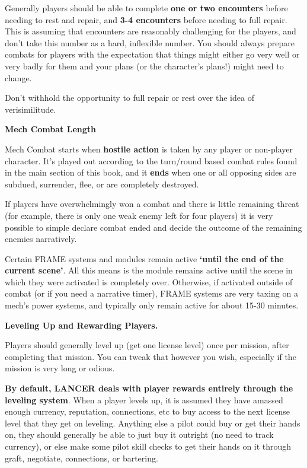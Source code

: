 Generally players should be able to complete \textbf{one or two encounters} before needing to rest and
repair, and \textbf{3-4 encounters} before needing to full repair. This is assuming that encounters are
reasonably challenging for the players, and don’t take this number as a hard, inflexible number.
You should always prepare combats for players with the expectation that things might either go
very well or very badly for them and your plans (or the character’s plans!) might need to change.

Don’t withhold the opportunity to full repair or rest over the idea of verisimilitude.

\begin{center}
     \textbf{Mech Combat Length}
\end{center}

Mech Combat starts when \textbf{hostile action} is taken by any player or non-player character. It’s
played out according to the turn/round based combat rules found in the main section of this
book, and it \textbf{ends} when one or all opposing sides are subdued, surrender, flee, or are completely
destroyed.

If players have overwhelmingly won a combat and there is little remaining threat (for example,
there is only one weak enemy left for four players) it is very possible to simple declare combat
ended and decide the outcome of the remaining enemies narratively.

Certain FRAME systems and modules remain active \textbf{‘until the end of the current scene’}. All this
means is the module remains active until the scene in which they were activated is completely
over. Otherwise, if activated outside of combat (or if you need a narrative timer), FRAME systems
are very taxing on a mech’s power systems, and typically only remain active for about 15-30
minutes.

\begin{center}
\textbf{Leveling Up and Rewarding Players.}
\end{center}

Players should generally level up (get one license level) once per mission, after completing that
mission. You can tweak that however you wish, especially if the mission is very long or odious.

\textbf{By default, LANCER deals with player rewards entirely through the leveling system}. When a
player levels up, it is assumed they have amassed enough currency, reputation, connections, etc
to buy access to the next license level that they get on leveling. Anything else a pilot could buy
or get their hands on, they should generally be able to just buy it outright (no need to track
currency), or else make some pilot skill checks to get their hands on it through graft, negotiate,
connections, or bartering.


